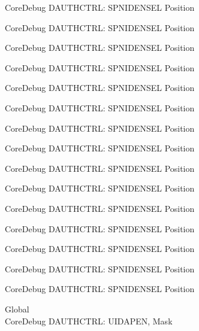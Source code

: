 \begin{DoxyRefList}
\label{deprecated__deprecated000141}%
%
Core\+Debug DAUTHCTRL\+: SPNIDENSEL Position 

\label{deprecated__deprecated000217}%
%
Core\+Debug DAUTHCTRL\+: SPNIDENSEL Position 

\label{deprecated__deprecated000280}%
%
Core\+Debug DAUTHCTRL\+: SPNIDENSEL Position 

\label{deprecated__deprecated000359}%
%
Core\+Debug DAUTHCTRL\+: SPNIDENSEL Position 

\label{deprecated__deprecated000435}%
%
Core\+Debug DAUTHCTRL\+: SPNIDENSEL Position 

\label{deprecated__deprecated000538}%
%
Core\+Debug DAUTHCTRL\+: SPNIDENSEL Position 

\label{deprecated__deprecated000640}%
%
Core\+Debug DAUTHCTRL\+: SPNIDENSEL Position 

\label{deprecated__deprecated000765}%
%
Core\+Debug DAUTHCTRL\+: SPNIDENSEL Position 

\label{deprecated__deprecated000819}%
%
Core\+Debug DAUTHCTRL\+: SPNIDENSEL Position 

\label{deprecated__deprecated000895}%
%
Core\+Debug DAUTHCTRL\+: SPNIDENSEL Position 

\label{deprecated__deprecated000958}%
%
Core\+Debug DAUTHCTRL\+: SPNIDENSEL Position 

\label{deprecated__deprecated001037}%
%
Core\+Debug DAUTHCTRL\+: SPNIDENSEL Position 

\label{deprecated__deprecated001113}%
%
Core\+Debug DAUTHCTRL\+: SPNIDENSEL Position 

\label{deprecated__deprecated001216}%
%
Core\+Debug DAUTHCTRL\+: SPNIDENSEL Position 

\label{deprecated__deprecated001318}%
%
Core\+Debug DAUTHCTRL\+: SPNIDENSEL Position  
\item[Global \doxylink{group___c_m_s_i_s___s_c_b_gad69e7195bbc5074466387d9c4d8bd529}{Core\+Debug\+\_\+\+DAUTHCTRL\+\_\+\+UIDAPEN\+\_\+\+Msk} ]\hfill \\
\label{deprecated__deprecated000082}%
%
Core\+Debug DAUTHCTRL\+: UIDAPEN, Mask 


\end{DoxyRefList}
